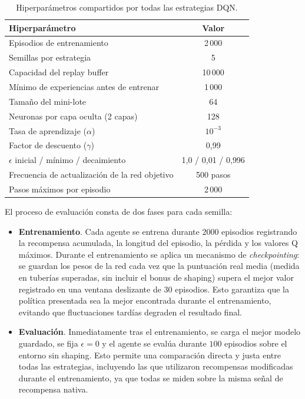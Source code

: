 \begin{table}[htbp]
\centering
\begin{scriptsize}
\begin{tabular}{l c}
\hline
\textbf{Hiperparámetro} & \textbf{Valor} \\
\hline
Episodios de entrenamiento        & 2\,000 \\
Semillas por estrategia           & 5 \\
Capacidad del replay buffer       & 10\,000 \\
Mínimo de experiencias antes de entrenar & 1\,000 \\
Tamaño del mini-lote              & 64 \\
Neuronas por capa oculta (2 capas) & 128 \\
Tasa de aprendizaje ($\alpha$)    & $10^{-3}$ \\
Factor de descuento ($\gamma$)    & 0{,}99 \\
$\epsilon$ inicial / mínimo / decaimiento & 1{,}0 / 0{,}01 / 0{,}996 \\
Frecuencia de actualización de la red objetivo & 500 pasos \\
Pasos máximos por episodio        & 2\,000 \\
\hline
\end{tabular}
\end{scriptsize}
\caption{Hiperparámetros compartidos por todas las estrategias DQN.}
\label{tab:dqn_hyperparams}
\end{table}

El proceso de evaluación consta de dos fases para cada semilla:

\begin{itemize}
    \item \textbf{Entrenamiento}. Cada agente se entrena durante $2000$ episodios registrando la recompensa acumulada, la longitud del episodio, la pérdida y los valores Q máximos. Durante el entrenamiento se aplica un mecanismo de \textit{checkpointing}: se guardan los pesos de la red cada vez que la puntuación real media (medida en tuberías superadas, sin incluir el bonus de shaping) supera el mejor valor registrado en una ventana deslizante de $30$ episodios. Esto garantiza que la política presentada sea la mejor encontrada durante el entrenamiento, evitando que fluctuaciones tardías degraden el resultado final.

    \item \textbf{Evaluación}. Inmediatamente tras el entrenamiento, se carga el mejor modelo guardado, se fija $\epsilon=0$ y el agente se evalúa durante $100$ episodios sobre el entorno sin shaping. Esto permite una comparación directa y justa  entre todas las estrategias, incluyendo las que utilizaron recompensas modificadas durante el entrenamiento, ya que todas se miden sobre la misma señal de recompensa nativa.
\end{itemize}

